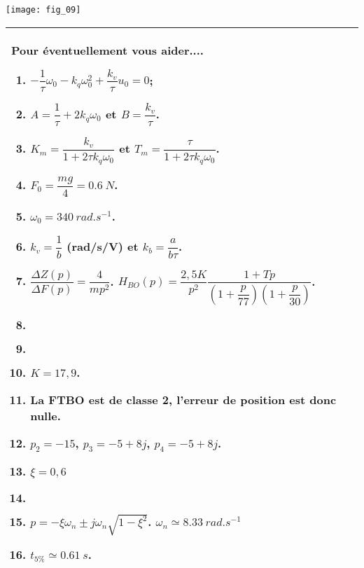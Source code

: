 \begin{multicols}{2}
\ifprof
\begin{corrige}
\end{corrige}
\else
\fi

\ifprof
\begin{corrige}
\end{corrige}
\else
\fi

\ifprof
\else
\begin{center}
\texttt{[image: fig\_09]}
\end{center}
\fi



\ifprof
\else
\begin{tabular}{|p{.95\linewidth}|}
\hline
\footnotesize
Pour éventuellement vous aider....
\begin{enumerate}
\item $-\dfrac{1}{\tau}\omega_0 - k_q \omega_0^2 + \dfrac{k_v}{\tau}u_0=0$;
\item $A=\dfrac{1}{\tau}+2k_q\omega_0$ et $B=\dfrac{k_v}{\tau}$.
\item $K_m=\dfrac{k_v}{1+2\tau k_q \omega_0}$ et $T_m=\dfrac{\tau}{1+2\tau k_q \omega_0}$.
\item $F_0=\dfrac{mg}{4}=\SI{0,6}{N}$.
\item $\omega_0=\SI{340}{rad.s^{-1}}$.
\item $k_v=\dfrac{1}{b}$ (rad/s/V) et $k_b=\dfrac{a}{b\tau}$.
\item $\dfrac{\Delta Z(p)}{\Delta F(p)}=\dfrac{4}{mp^2}$. $H_{BO}(p)=\dfrac{2,5 K}{p^2}\dfrac{1+Tp}{\left( 1+\dfrac{p}{77}\right)\left(1+\dfrac{p}{30} \right)}$.
\item  $\quad$
\item $\quad$
\item $K=17,9$.
\item La FTBO est de classe 2, l'erreur de position est donc nulle.
\item $p_2=-15$, $p_3 = -5+8j$, $p_4=-5+8j$.
\item $\xi=0,6$
\item $\quad$
\item $p=-\xi\omega_n \pm j\omega_n \sqrt{1-\xi^2}$. $\omega_n\simeq \SI{8,33}{rad.s^{-1}}$
\item $t_{5\%}\simeq \SI{0,61}{ s}$. 
\end{enumerate} \\ \hline
\end{tabular}
\normalsize
\fi

\ifprof
\else
\end{multicols}

\fi
%
%
%
%
%
%
